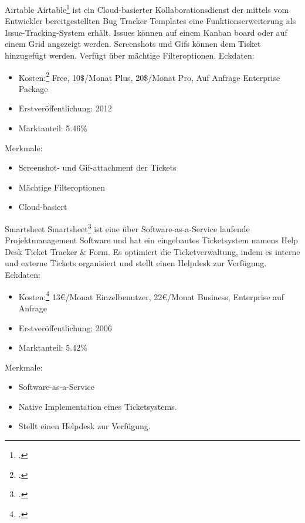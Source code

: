 Airtable				
Airtable\footcite{airtable} ist ein Cloud-basierter Kollaborationsdienst der mittels vom Entwickler bereitgestellten Bug Tracker Templates eine Funktionserweiterung als Issue-Tracking-System erhält. Issues können auf einem Kanban board oder auf einem Grid angezeigt werden. Screenshots und Gifs können dem Ticket hinzugefügt werden. Verfügt über mächtige Filteroptionen.	
Eckdaten:
\begin{itemize}
	\item Kosten:\footcite{airtable-pricing} Free, 10\$/Monat Plus, 20\$/Monat Pro, Auf Anfrage Enterprise Package
	\item Erstveröffentlichung: 2012 
	\item Marktanteil: 5.46\%
\end{itemize}				
Merkmale:
\begin{itemize}
	\item Screenshot- und Gif-attachment der Tickets
	\item Mächtige Filteroptionen
	\item Cloud-basiert
\end{itemize}
Smartsheet				
Smartsheet\footcite{smartsheet} ist eine über Software-as-a-Service laufende Projektmanagement Software und hat ein eingebautes Ticketsystem namens Help Desk Ticket Tracker \& Form. Es optimiert die Ticketverwaltung, indem es interne und externe Tickets organisiert und stellt einen Helpdesk zur Verfügung. 
Eckdaten:
\begin{itemize}
	\item Kosten:\footcite{smartsheet-pricing} 13€/Monat Einzelbenutzer, 22€/Monat Business, Enterprise auf Anfrage
	\item Erstveröffentlichung: 2006
	\item Marktanteil: 5.42\%
\end{itemize}		
Merkmale:
\begin{itemize}
	\item Software-as-a-Service
	\item Native Implementation eines Ticketsystems.
	\item Stellt einen Helpdesk zur Verfügung.
\end{itemize}
